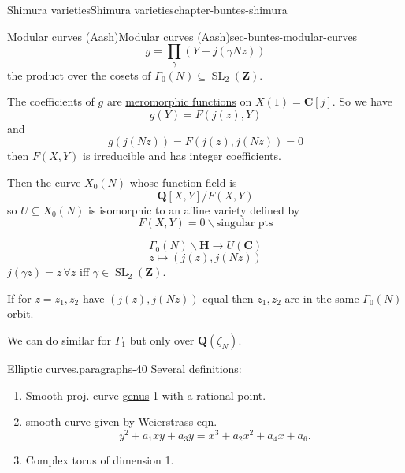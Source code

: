 \documentclass[oneside,10pt,]{book}
\numberwithin{equation}{section}
\newcommand{\lb}{[}
\newcommand{\rb}{]}
\newcommand{\ZZ}{\mathbf{Z}}
\newcommand{\QQ}{\mathbf{Q}}
\newcommand{\CC}{\mathbf{C}}
\newcommand{\HH}{\mathbf{H}}
\DeclareMathOperator{\SL}{SL}
\begin{document}
\begin{chapterptx}{Shimura varieties}{}{Shimura varieties}{}{}{chapter-buntes-shimura}
\begin{sectionptx}{Modular curves (Aash)}{}{Modular curves (Aash)}{}{}{sec-buntes-modular-curves}
\begin{equation*}
g = \prod_{\gamma} (Y - j(\gamma Nz))
\end{equation*}
the product over the cosets of \(\Gamma_0(N) \subseteq \SL_2(\ZZ)\).%
\par
\hypertarget{p-1042}{}%
The coefficients of \(g\) are \hyperref[def-morph-riem-surf]{meromorphic functions} on \(X(1) = \CC\lb j \rb\). So we have%
\begin{equation*}
g(Y) = F(j(z), Y)
\end{equation*}
and%
\begin{equation*}
g (j(Nz)) = F(j(z), j(Nz)) = 0
\end{equation*}
then \(F(X,Y)\) is irreducible and  has integer coefficients.%
\par
\hypertarget{p-1043}{}%
Then the curve \(X_0(N)\) whose function field is%
\begin{equation*}
\QQ \lb X,Y\rb/ F(X,Y)
\end{equation*}
so \(U \subseteq X_0(N)\) is isomorphic to an affine variety defined by%
\begin{equation*}
F(X,Y) = 0 \smallsetminus \text{singular pts}
\end{equation*}
%
\par
\hypertarget{p-1044}{}%
%
\begin{equation*}
\Gamma_0(N) \backslash \HH \to U(\CC)
\end{equation*}
%
\begin{equation*}
z \mapsto (j(z), j(Nz))
\end{equation*}
\(j(\gamma z) = z\,\forall z\) iff \(\gamma \in \SL_2(\ZZ)\).%
\par
\hypertarget{p-1045}{}%
If for \(z= z_1,z_2\) have \((j(z),j(Nz))\) equal then \(z_1,z_2\) are in the same \(\Gamma_0(N)\) orbit.%
\par
\hypertarget{p-1046}{}%
We can do similar for \(\Gamma_1\) but only over \(\QQ(\zeta_N)\).%
\begin{paragraphs}{Elliptic curves.}{paragraphs-40}%
\hypertarget{p-1047}{}%
Several definitions:\leavevmode%
\begin{enumerate}
\item\hypertarget{li-265}{}Smooth proj. curve \hyperref[def-class-set]{genus} 1 with a rational point.%
\item\hypertarget{li-266}{}smooth curve given by Weierstrass eqn.%
\begin{equation*}
y^2 + a_1xy + a_3 y =  x^3 + a_2x^2 + a_4 x + a_6\text{.}
\end{equation*}
%
\item\hypertarget{li-267}{}Complex torus of  dimension 1.%

\end{enumerate}
\end{paragraphs}
\end{sectionptx}
\end{chapterptx}
\end{document}
